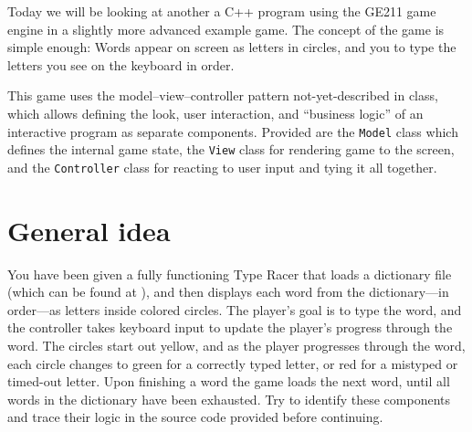 \documentclass{tufte-handout}
\begin{document}
\maketitle

Today we will be looking at another a C++ program using the GE211 game
engine in a slightly more advanced example game. The concept of the game
is simple enough: Words appear on screen as letters in circles, and you
to type the letters you see on the keyboard in order.

This game uses the model--view--controller pattern not-yet-described in
class, which allows defining the look, user interaction, and ``business
logic'' of an interactive program as separate components. Provided are
the \texttt{Model} class which defines the internal game state, the
\texttt{View} class for rendering game to the screen, and the
\texttt{Controller} class for reacting to user input and tying it all
together.

\CxxPrelims*

\newpage

\section{General idea}

You have been given a fully functioning Type Racer that loads a
dictionary file (which can be found at
), and then displays each word from the
dictionary---in order---as letters inside colored circles. The player's
goal is to type the word, and the controller takes keyboard input to
update the player's progress through the word. The circles start out
yellow, and as the player progresses through the word, each circle
changes to green for a correctly typed letter, or red for a mistyped or
timed-out letter. Upon finishing a word the game loads the next word,
until all words in the dictionary have been exhausted. Try to identify
these components and trace their logic in the source code provided
before continuing.
\end{document}
